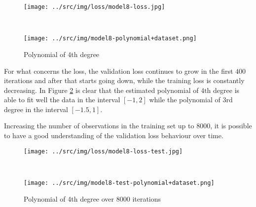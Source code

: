 \documentclass[a4paper,12pt]{article} %
\begin{document}
	\begin{figure}[H]
		\begin{minipage}[c]{.49\textwidth}
			\centering
			\texttt{[image: ../src/img/loss/model8-loss.jpg]}
		\end{minipage}
		~
		\begin{minipage}[c]{.49\textwidth}
			\centering
			\texttt{[image: ../src/img/model8-polynomial+dataset.png]}
		\end{minipage}
	\caption{Polynomial of 4th degree}
	\label{fig:model8}
	\end{figure}

	For what concerns the loss, the validation loss continues to grow in the 
	first $400$ iterations and after that starts going down, while the 
	training loss is constantly decreasing.
	In Figure \ref*{fig:model8-test} is clear that the estimated 
	polynomial of $4\mathrm{th}$ degree is able to fit well the data in 
	the interval $[-1,2]$ while the polynomial of $3\mathrm{rd}$ degree 
	in the interval $[-1.5,1]$.\bigskip
	
	Increasing the number of observations in the training set up to $8000$, it 
	is possible to have a good understanding of the validation loss behaviour 
	over time. 
	
	\begin{figure}[H]
		\begin{minipage}[c]{.49\textwidth}
			\centering
			\texttt{[image: ../src/img/loss/model8-loss-test.jpg]}
		\end{minipage}
		~
		\begin{minipage}[c]{.49\textwidth}
			\centering
			\texttt{[image: ../src/img/model8-test-polynomial+dataset.png]}
		\end{minipage}
	\caption{Polynomial of 4th degree over $8000$ iterations}
	\label{fig:model8-test}
	\end{figure}
\end{document}
